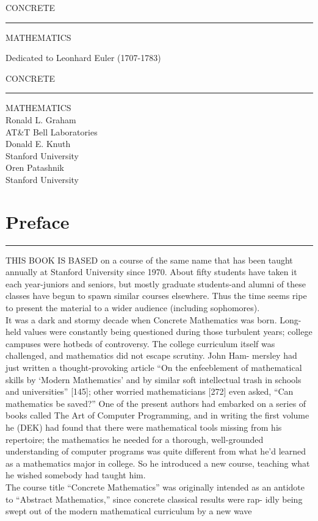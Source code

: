 \documentclass[a4paper]{article}
\begin{document}
CONCRETE
\hrule 
MATHEMATICS

Dedicated to Leonhard Euler (1707-1783)
\newpage

CONCRETE
\hrule 
MATHEMATICS
\\
Ronald L. Graham \\
AT\&T Bell Laboratories \\
Donald E. Knuth \\
Stanford University \\
Oren Patashnik \\
Stanford University \\

\newpage

\section*{Preface}
\hrule
\vspace{10px}
THIS BOOK IS BASED on a course of the same name that has been taught
annually at Stanford University since 1970. About fifty students have taken it
each year-juniors and seniors, but mostly graduate students-and alumni
of these classes have begun to spawn similar courses elsewhere. Thus the time
seems ripe to present the material to a wider audience (including sophomores).\\
\indent It was a dark and stormy decade when Concrete Mathematics was born.
Long-held values were constantly being questioned during those turbulent
years; college campuses were hotbeds of controversy. The college curriculum
itself was challenged, and mathematics did not escape scrutiny. John Ham-
mersley had just written a thought-provoking article ``On the enfeeblement of
mathematical skills by `Modern Mathematics' and by similar soft intellectual
trash in schools and universities'' [145]; other worried mathematicians [272]
even asked, ``Can mathematics be saved?'' One of the present authors had
 embarked on a series of books called The Art of Computer Programming, and
in writing the first volume he (DEK) had found that there were mathematical
tools missing from his repertoire; the mathematics he needed for a thorough,
 well-grounded understanding of computer programs was quite different from
 what he'd learned as a mathematics major in college. So he introduced a new
course, teaching what he wished somebody had taught him.
\\
\indent The course title ``Concrete Mathematics'' was originally intended as an
antidote to ``Abstract Mathematics,'' since concrete classical results were rap-
idly being swept out of the modern mathematical curriculum by a new wave
\end{document}
